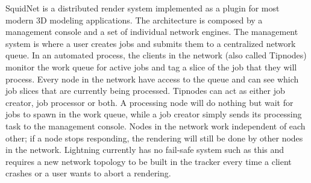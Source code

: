 
SquidNet is a distributed render system implemented as a plugin for most modern 3D modeling applications. The architecture is composed by a management console and a set of individual network engines. The management system is where a user creates jobs and submits them to a centralized network queue. In an automated process, the clients in the network (also called Tipnodes) monitor the work queue for active jobs and tag a slice of the job that they will process. Every node in the network have access to the queue and can see which job slices that are currently being processed. Tipnodes can act as either job creator, job processor or both. A processing node will do nothing but wait for jobs to spawn in the work queue, while a job creator simply sends its processing task to the management console. Nodes in the network work independent of each other; if a node stops responding, the rendering will still be done by other nodes in the network. Lightning currently has no fail-safe system such as this and requires a new network topology to be built in the tracker every time a client crashes or a user wants to abort a rendering. 







